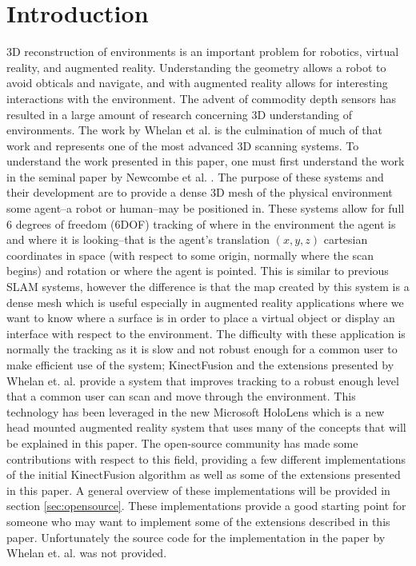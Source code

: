 \documentclass[10pt, twocolumn]{article}
\begin{document}
\section{Introduction}
3D reconstruction of environments is an important problem for robotics, virtual reality, and augmented reality. Understanding the geometry allows a robot to avoid obticals and navigate, and with augmented reality allows for interesting interactions with the environment. The advent of commodity depth sensors has resulted in a large amount of research concerning 3D understanding of environments. The work by Whelan et al. is the culmination of much of that work and represents one of the most advanced 3D scanning systems. To understand the work presented in this paper, one must first understand the work in the seminal paper by Newcombe et al. \cite{newcombe11}.
The purpose of these systems and their development are to provide a dense 3D mesh of the physical environment some agent--a robot or human--may be positioned in. These systems allow for full 6 degrees of freedom (6DOF) tracking of where in the environment the agent is and where it is looking--that is the agent's translation $(x, y, z)$ cartesian coordinates in space (with respect to some origin, normally where the scan begins) and rotation or where the agent is pointed. 
This is similar to previous SLAM systems, however the difference is that the map created by this system is a dense mesh which is useful especially in augmented reality applications where we want to know where a surface is in order to place a virtual object or display an interface with respect to the environment. 
The difficulty with these application is normally the tracking as it is slow and not robust enough for a common user to make efficient use of the system; KinectFusion and the extensions presented by Whelan et. al. provide a system that improves tracking to a robust enough level that a common user can scan and move through the environment. This technology has been leveraged in the new Microsoft HoloLens \cite{hololens} which is a new head mounted augmented reality system that uses many of the concepts that will be explained in this paper. 
The open-source community has made some contributions with respect to this field, providing a few different implementations of the initial KinectFusion algorithm as well as some of the extensions presented in this paper. A general overview of these implementations will be provided in section \ref{sec:opensource}. These implementations provide a good starting point for someone who may want to implement some of the extensions described in this paper. Unfortunately the source code for the implementation in the paper by Whelan et. al. was not provided.
\end{document}
